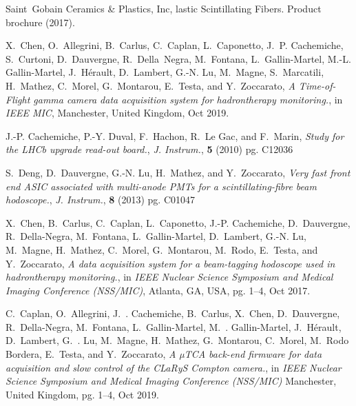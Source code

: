 \documentclass[a4paper,11pt]{article}
\begin{document}
\begin{thebibliography}{99}
{Saint~Gobain Ceramics \& Plastics, Inc},
lastic {S}cintillating {F}ibers.
\newblock Product brochure (2017).

X.~Chen, O.~Allegrini, B.~Carlus, C.~Caplan, L.~Caponetto, J.~P. Cachemiche,
  S.~Curtoni, D.~Dauvergne, R.~Della~Negra, M.~Fontana, L.~Gallin-Martel, M.-L.
  Gallin-Martel, J.~H{\'e}rault, D.~Lambert, G.-N. Lu, M.~Magne, S.~Marcatili,
  H.~Mathez, C.~Morel, G.~Montarou, E.~Testa, and Y.~Zoccarato, \emph{A {T}ime-of-{F}light gamma camera data acquisition system for hadrontherapy monitoring.}, in \emph{{IEEE MIC}}, Manchester, United Kingdom, Oct 2019.

J.-P. Cachemiche, P.-Y. Duval, F.~Hachon, R.~Le Gac, and F.~Marin, \emph{Study for the {LHCb} upgrade read-out board.}, \emph{J. Instrum.}, \textbf{5} (2010) pg. C12036

S.~Deng, D.~Dauvergne, G.-N. Lu, H.~Mathez, and Y.~Zoccarato, \emph{Very fast front end {ASIC} associated with multi-anode {PMTs} for a
  scintillating-fibre beam hodoscope.}, \emph{J. Instrum.}, \textbf{8} (2013) pg. C01047

X.~Chen, B.~Carlus, C.~Caplan, L.~Caponetto, J.-P. Cachemiche, D.~Dauvergne,
  R.~Della-Negra, M.~Fontana, L.~Gallin-Martel, D.~Lambert, G.-N. Lu, M.~Magne,
  H.~Mathez, C.~Morel, G.~Montarou, M.~Rodo, E.~Testa, and Y.~Zoccarato, \emph{A data acquisition system for a beam-tagging hodoscope used in
  hadrontherapy monitoring.}, in \emph{IEEE Nuclear Science Symposium and Medical Imaging Conference (NSS/MIC)}, Atlanta, GA, USA,  pg. 1--4, Oct 2017.

C.~{Caplan}, O.~{Allegrini}, J.~. {Cachemiche}, B.~{Carlus}, X.~{Chen},
  D.~{Dauvergne}, R.~{Della-Negra}, M.~{Fontana}, L.~{Gallin-Martel}, M.~.
  {Gallin-Martel}, J.~{Hérault}, D.~{Lambert}, G.~. {Lu}, M.~{Magne},
  H.~{Mathez}, G.~{Montarou}, C.~{Morel}, M.~{Rodo Bordera}, E.~{Testa}, and
  Y.~{Zoccarato}, \emph{A µ{TCA} back-end firmware for data acquisition and slow control of the {CL}a{R}y{S} {C}ompton camera.}, in \emph{IEEE Nuclear Science Symposium and Medical Imaging Conference (NSS/MIC)} Manchester, United Kingdom, pg. 1--4, Oct 2019.
  

\end{thebibliography}
\end{document}

